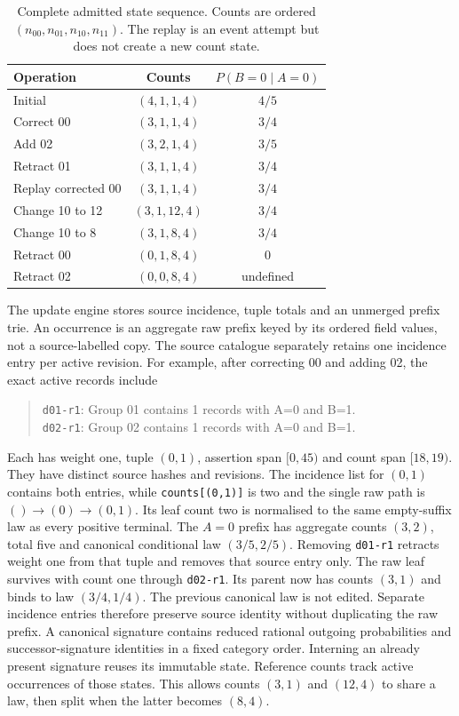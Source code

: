 \begin{table}[h]
\caption{Complete admitted state sequence.
Counts are ordered \((n_{00},n_{01},n_{10},n_{11})\).
The replay is an event attempt but does not create a new count state.}
\label{tab:dm-edits}
\begin{ruledtabular}
\begin{tabular}{lcc}
Operation & Counts & \(P(B=0\mid A=0)\)\\
\hline
Initial & \((4,1,1,4)\)&\(4/5\)\\
Correct 00 & \((3,1,1,4)\)&\(3/4\)\\
Add 02 & \((3,2,1,4)\)&\(3/5\)\\
Retract 01 & \((3,1,1,4)\)&\(3/4\)\\
Replay corrected 00 & \((3,1,1,4)\)&\(3/4\)\\
Change 10 to 12 & \((3,1,12,4)\)&\(3/4\)\\
Change 10 to 8 & \((3,1,8,4)\)&\(3/4\)\\
Retract 00 & \((0,1,8,4)\)&\(0\)\\
Retract 02 & \((0,0,8,4)\)&undefined\\
\end{tabular}
\end{ruledtabular}
\end{table}

The update engine stores source incidence, tuple totals and an unmerged prefix trie.
An occurrence is an aggregate raw prefix keyed by its ordered field values, not a source-labelled copy.
The source catalogue separately retains one incidence entry per active revision.
For example, after correcting 00 and adding 02, the exact active records include
\begin{quote}\small
\texttt{d01-r1}: Group 01 contains 1 records with A=0 and B=1.\\
\texttt{d02-r1}: Group 02 contains 1 records with A=0 and B=1.
\end{quote}
Each has weight one, tuple \((0,1)\), assertion span \([0,45)\) and count span \([18,19)\).
They have distinct source hashes and revisions.
The incidence list for \((0,1)\) contains both entries, while \texttt{counts[(0,1)]} is two and the single raw path is \(()\to(0)\to(0,1)\).
Its leaf count two is normalised to the same empty-suffix law as every positive terminal.
The \(A=0\) prefix has aggregate counts \((3,2)\), total five and canonical conditional law \((3/5,2/5)\).
Removing \texttt{d01-r1} retracts weight one from that tuple and removes that source entry only.
The raw leaf survives with count one through \texttt{d02-r1}.
Its parent now has counts \((3,1)\) and binds to law \((3/4,1/4)\).
The previous canonical law is not edited.
Separate incidence entries therefore preserve source identity without duplicating the raw prefix.
A canonical signature contains reduced rational outgoing probabilities and successor-signature identities in a fixed category order.
Interning an already present signature reuses its immutable state.
Reference counts track active occurrences of those states.
This allows counts \((3,1)\) and \((12,4)\) to share a law, then split when the latter becomes \((8,4)\).

